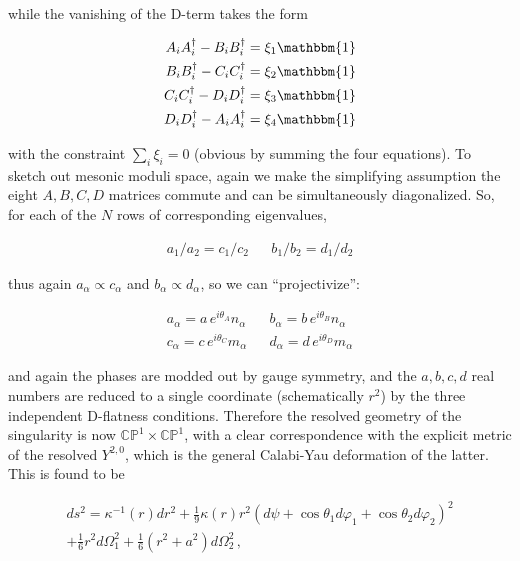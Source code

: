 while the vanishing of the D-term takes the form

\begin{align}
	\begin{split}
		A_i A^\dagger_i - B_i B^\dagger_i = \xi_1 \mathbbm{1} \\
		B_i B^\dagger_i - C_i C^\dagger_i = \xi_2 \mathbbm{1} \\
		C_i C^\dagger_i - D_i D^\dagger_i = \xi_3 \mathbbm{1} \\
		D_i D^\dagger_i - A_i A^\dagger_i = \xi_4 \mathbbm{1}
	\end{split}
	\label{}
\end{align}

with the constraint $\sum_i \xi_i = 0$ (obvious by summing the four equations). To sketch out mesonic moduli space, again we make the simplifying assumption the eight $A, B, C, D$ matrices commute and can be simultaneously diagonalized. So, for each of the $N$ rows of corresponding eigenvalues,

\begin{align}
	a_1/a_2 = c_1/c_2 && b_1/b_2 = d_1 / d_2
	\label{}
\end{align}

thus again $a_\alpha \propto c_\alpha$ and $b_\alpha \propto d_\alpha$, so we can ``projectivize'':

\begin{align}
		a_\alpha = a \, e^{i\theta_A} n_\alpha && b_\alpha = b \, e^{i\theta_B} n_\alpha \\
		c_\alpha = c \, e^{i\theta_C} m_\alpha && d_\alpha = d \, e^{i\theta_D} m_\alpha 
\end{align}

and again the phases are modded out by gauge symmetry, and the $a, b, c, d$ real numbers are reduced to a single coordinate (schematically $r^2$) by the three independent D-flatness conditions. Therefore the resolved geometry of the singularity is now $\mathbb{CP}^1 \times \mathbb{CP}^1$, with a clear correspondence with the explicit metric of the resolved $Y^{2,0}$, which is the general Calabi-Yau deformation of the latter. This is found to be\cite{copycit}

\begin{equation}
	\begin{split}
	ds^2 = \kappa^{-1}(r) dr^2 + \frac{1}{9} \kappa(r) r^2 \left( d\psi + \cos\theta_1 d\varphi_1 + \cos\theta_2 d\varphi_2 \right)^2 \\
	+ \frac{1}{6} r^2 d\Omega_1^2 + \frac{1}{6}(r^2 + a^2) d\Omega_2^2\,,
	\label{genCYy20cones}
\end{split}
\end{equation}


